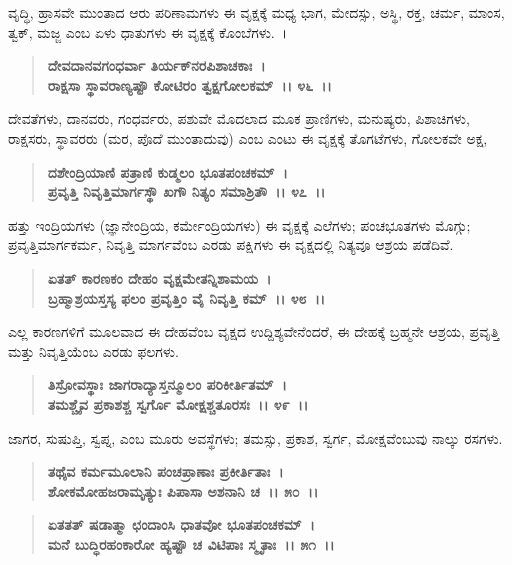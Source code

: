 ವೃದ್ಧಿ, ಹ್ರಾಸವೇ ಮುಂತಾದ ಆರು ಪರಿಣಾಮಗಳು ಈ ವೃಕ್ಷಕ್ಕೆ ಮಧ್ಯ ಭಾಗ, ಮೇದಸ್ಸು, ಅಸ್ಥಿ, ರಕ್ತ, ಚರ್ಮ, ಮಾಂಸ, ತ್ವಕ್, ಮಜ್ಜ ಎಂಬ ಏಳು ಧಾತುಗಳು ಈ ವೃಕ್ಷಕ್ಕೆ ಕೊಂಬೆಗಳು.~।

\begin{verse}
\textbf{ದೇವದಾನವಗಂಧರ್ವಾ ತಿರ್ಯಕ್‌ನರಪಿಶಾಚಕಾಃ~।}\\\textbf{ರಾಕ್ಷಸಾ ಸ್ಥಾವರಾಣ್ಯಷ್ಟೌ ಕೋಟಿರಂ ತ್ವಕ್ಷಗೋಲಕಮ್~।। ೪೬~।।}
\end{verse}

ದೇವತೆಗಳು, ದಾನವರು, ಗಂಧರ್ವರು, ಪಶುವೇ ಮೊದಲಾದ ಮೂಕ ಪ್ರಾಣಿಗಳು, ಮನುಷ್ಯರು, ಪಿಶಾಚಿಗಳು, ರಾಕ್ಷಸರು, ಸ್ಥಾವರರು (ಮರ, ಪೊದೆ ಮುಂತಾದುವು) ಎಂಬ ಎಂಟು ಈ ವೃಕ್ಷಕ್ಕೆ ತೊಗಟೆಗಳು, ಗೋಲಕವೇ ಅಕ್ಷ,

\begin{verse}
\textbf{ದಶೇಂದ್ರಿಯಾಣಿ ಪತ್ರಾಣಿ ಕುಡ್ಮಲಂ ಭೂತಪಂಚಕಮ್~।}\\\textbf{ಪ್ರವೃತ್ತಿ ನಿವೃತ್ತಿಮಾರ್ಗಸ್ಥೌ ಖಗೌ ನಿತ್ಯಂ ಸಮಾಶ್ರಿತೌ~।। ೪೭~।।}
\end{verse}

ಹತ್ತು ಇಂದ್ರಿಯಗಳು (ಜ್ಞಾನೇಂದ್ರಿಯ, ಕರ್ಮೇಂದ್ರಿಯಗಳು) ಈ ವೃಕ್ಷಕ್ಕೆ ಎಲೆಗಳು; ಪಂಚಭೂತಗಳು ಮೊಗ್ಗು; ಪ್ರವೃತ್ತಿಮಾರ್ಗಕರ್ಮ, ನಿವೃತ್ತಿ ಮಾರ್ಗವೆಂಬ ಎರಡು ಪಕ್ಷಿಗಳು ಈ ವೃಕ್ಷದಲ್ಲಿ ನಿತ್ಯವೂ ಆಶ್ರಯ ಪಡೆದಿವೆ.

\begin{verse}
\textbf{ಏತತ್ ಕಾರಣಕಂ ದೇಹಂ ವೃಕ್ಷಮೇತನ್ನಿಶಾಮಯ~।}\\\textbf{ಬ್ರಹ್ಮಾಶ್ರಯಸ್ತಸ್ಯ ಫಲಂ ಪ್ರವೃತ್ತಿಂ ವೈ ನಿವೃತ್ತಿ ಕಮ್~।। ೪೮~।।}
\end{verse}

ಎಲ್ಲ ಕಾರಣಗಳಿಗೆ ಮೂಲವಾದ ಈ ದೇಹವೆಂಬ ವೃಕ್ಷದ ಉದ್ದಿಶ್ಯವೇನೆಂದರೆ, ಈ ದೇಹಕ್ಕೆ ಬ್ರಹ್ಮನೇ ಆಶ್ರಯ, ಪ್ರವೃತ್ತಿ ಮತ್ತು ನಿವೃತ್ತಿಯೆಂಬ ಎರಡು ಫಲಗಳು.

\begin{verse}
\textbf{ತಿಸ್ರೋವಸ್ಥಾಃ ಜಾಗರಾದ್ಯಾಸ್ತನ್ಮೂಲಂ ಪರಿಕೀರ್ತಿತಮ್~।}\\\textbf{ತಮಶ್ಚೈವ ಪ್ರಕಾಶಶ್ಚ ಸ್ವರ್ಗೊ ಮೋಕ್ಷಶ್ಚತೂರಸಃ~।। ೪೯~।।}
\end{verse}

ಜಾಗರ, ಸುಷುಪ್ತಿ, ಸ್ವಪ್ನ, ಎಂಬ ಮೂರು ಅವಸ್ಥೆಗಳು; ತಮಸ್ಸು, ಪ್ರಕಾಶ, ಸ್ವರ್ಗ, ಮೋಕ್ಷವೆಂಬುವು ನಾಲ್ಕು ರಸಗಳು.

\begin{verse}
\textbf{ತಥೈವ ಕರ್ಮಮೂಲಾನಿ ಪಂಚಪ್ರಾಣಾಃ ಪ್ರಕೀರ್ತಿತಾಃ~।}\\\textbf{ಶೋಕಮೋಹಜರಾಮೃತ್ಯುಃ ಪಿಪಾಸಾ ಅಶನಾನಿ ಚ~।। ೫೦~।।}
\end{verse}

\begin{verse}
\textbf{ಏತತತ್ ಷಡಾತ್ಮಾ ಛಂದಾಂಸಿ ಧಾತವೋ ಭೂತಪಂಚಕಮ್~।}\\\textbf{ಮನೆ ಬುದ್ಧಿರಹಂಕಾರೋ ಹ್ಯಷ್ಟೌ ಚ ವಿಟಿಪಾಃ ಸ್ಮೃತಾಃ~।। ೫೧~।।}
\end{verse}

